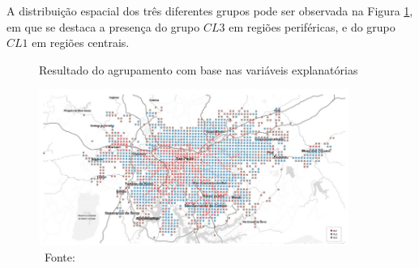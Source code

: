 A distribuição espacial dos três diferentes grupos pode ser observada na Figura \ref{fig:merchanSP}, em que se destaca a presença do grupo $CL3$ em regiões periféricas, e do grupo $CL1$ em regiões centrais.

\begin{figure}[htb]
    \centering
    \caption{Resultado do agrupamento com base nas variáveis explanatórias}
    \includegraphics[width=0.9\textwidth]{images/2_revisao/merchan_sp_example.png}
    \caption*{\ Fonte: }
    \label{fig:merchanSP}
\end{figure}


